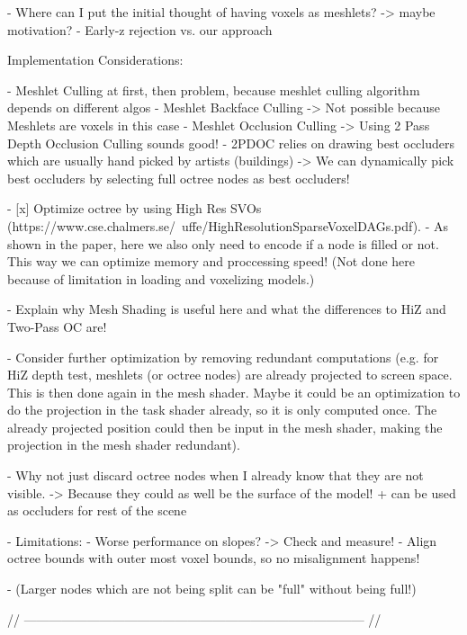 - Where can I put the initial thought of having voxels as meshlets? -> maybe motivation? 
- Early-z rejection vs. our approach

Implementation Considerations:

- Meshlet Culling at first, then problem, because meshlet culling algorithm depends on different algos
    - Meshlet Backface Culling -> Not possible because Meshlets are voxels in this case
    - Meshlet Occlusion Culling -> Using 2 Pass Depth Occlusion Culling sounds good!
    - 2PDOC relies on drawing best occluders which are usually hand picked by artists (buildings)
        -> We can dynamically pick best occluders by selecting full octree nodes as best occluders!

- [x] Optimize octree by using High Res SVOs (https://www.cse.chalmers.se/~uffe/HighResolutionSparseVoxelDAGs.pdf).
    - As shown in the paper, here we also only need to encode if a node is filled or not. This way we can 
    optimize memory and proccessing speed! (Not done here because of limitation in loading and voxelizing models.)

- Explain why Mesh Shading is useful here and what the differences to HiZ and Two-Pass OC are!

- Consider further optimization by removing redundant computations (e.g. for HiZ depth test, meshlets (or octree nodes)
are already projected to screen space. This is then done again in the mesh shader. Maybe it could be an optimization 
to do the projection in the task shader already, so it is only computed once. The already projected position 
could then be input in the mesh shader, making the projection in the mesh shader redundant).

- Why not just discard octree nodes when I already know that they are not visible. -> Because they could as well be the
  surface of the model! + can be used as occluders for rest of the scene

- Limitations: 
    - Worse performance on slopes? -> Check and measure!
    - Align octree bounds with outer most voxel bounds, so no misalignment happens!

    - (Larger nodes which are not being split can be "full" without being full!)

// --------------------------------------------------------------------------------- //
